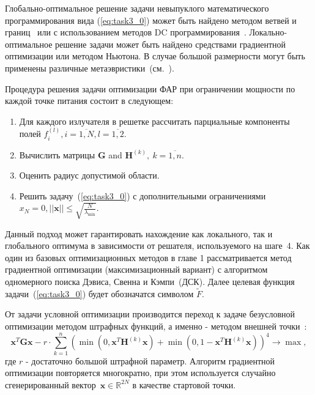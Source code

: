 Глобально-оптимальное решение задачи невыпуклого математического программирования вида (\ref{eq:task3_0}) может быть найдено методом
ветвей и границ~ или с использованием методов DC программирования~. Локально-оптимальное решение задачи может быть найдено средствами градиентной оптимизации или методом Ньютона. В случае большой размерности могут быть применены различные метаэвристики~(см.~).

Процедура решения задачи оптимизации ФАР при ограничении мощности по каждой точке питания состоит в следующем:
%
\begin{enumerate}
  \item Для каждого излучателя в решетке рассчитать парциальные компоненты полей $f_i^{(l)}, i= \overline{1,N}, l=\overline{1,2}$.
  \item Вычислить матрицы $\textbf{G}$ and ${\textbf{H}}^{(k)},\ k=\overline{1,n}$.
  \item Оценить радиус допустимой области.
  \item Решить задачу~(\ref{eq:task3_0}) с дополнительными ограничениями $x_N = 0, ||\textbf{x}||\le \sqrt{\frac{N}{\lambda_{\min}}}$.
\end{enumerate}

Данный подход может гарантировать нахождение как локального, так и глобального оптимума в зависимости от решателя, используемого на шаге~4. Как один из базовых оптимизационных методов в главе 1 рассматривается метод градиентной оптимизации (максимизационный вариант)
с алгоритмом одномерного поиска Дэвиса, Свенна и Кэмпи~(ДСК). Далее целевая функция задачи~(\ref{eq:task3_0}) будет обозначатся символом $\tilde{F}$.

От задачи условной оптимизации производится переход к задаче безусловной оптимизации методом штрафных функций, а именно -
методом внешней точки~:
\begin{equation}
       \textbf{x}^{T}\textbf{Gx} - r\cdot \sum_{k=1}^n
       \left( \min\left(0,\textbf{x}^{T}\textbf{H}^{(k)}\textbf{x}\right) +
       \min\left(0,1-\textbf{x}^{T}\textbf{H}^{(k)}\textbf{x}\right)\right)^4 \rightarrow
       \max,
     \label{eq:task4}
\end{equation}
где $r$ - достаточно большой штрафной параметр. Алгоритм градиентной оптимизации повторяется многократно, при этом используется случайно сгенерированный вектор~$\textbf{x}\in \mathbb{R}^{2N}$ в качестве стартовой точки.

